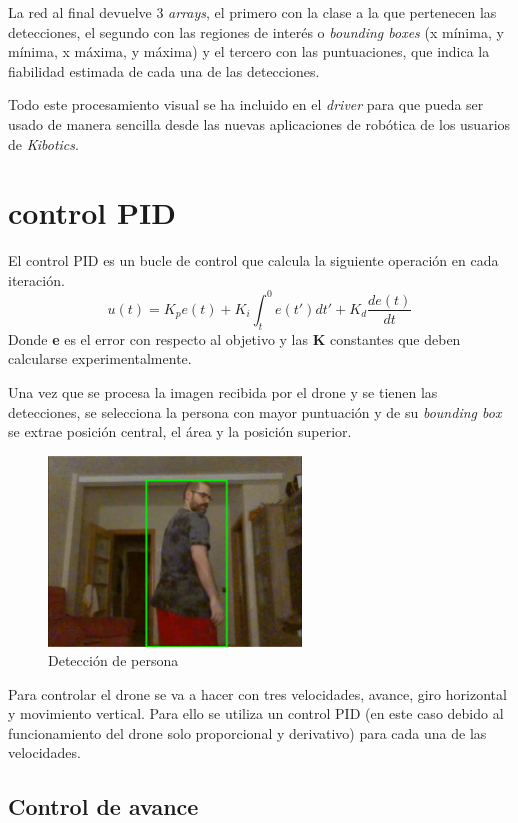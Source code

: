 La red al final devuelve 3 \textit{arrays}, el primero con la clase a la que pertenecen las detecciones, el segundo con las regiones de interés o \textit{bounding boxes} (x mínima, y mínima, x máxima, y máxima) y el tercero con las puntuaciones, que indica la fiabilidad estimada de cada una de las detecciones.

Todo este procesamiento visual se ha incluido en el \textit{driver} para que pueda ser usado de manera sencilla desde las nuevas aplicaciones de robótica de los usuarios de \textit{Kibotics}.

\section{control PID}
El control PID es un bucle de control que calcula la siguiente operación en cada iteración.
\[ u(t) = K_p e(t) + K_i \int_{t}^{0} e(t') dt' + K_d \frac{de(t)}{dt}\]
Donde \textbf{e} es el error con respecto al objetivo y las \textbf{K} constantes que deben calcularse experimentalmente.

Una vez que se procesa la imagen recibida por el drone y se tienen las detecciones, se selecciona la persona con mayor puntuación y de su \textit{bounding box} se extrae posición central, el área y la posición superior.

\begin{figure}[H]
  \begin{center}
    \includegraphics[width=0.6\textwidth]{figures/real/cap3.png}
		\caption{Detección de persona}
		\label{fig:bbox_ideal}
		\end{center}
\end{figure}

Para controlar el drone se va a hacer con tres velocidades, avance, giro horizontal y movimiento vertical. Para ello se utiliza un control PID (en este caso debido al funcionamiento del drone solo proporcional y derivativo) para cada una de las velocidades.
\subsection*{Control de avance}

